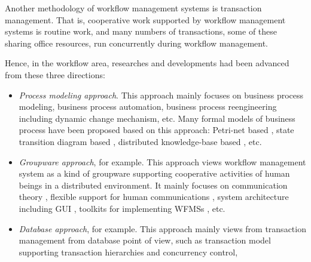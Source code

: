Another methodology of workflow management systems is transaction
management.  That is, cooperative work supported by workflow management
systems is routine work, and many numbers of transactions, some of these 
sharing office resources, run concurrently during workflow management.

Hence, in the workflow area, researches and developments had been
advanced from these three directions:
\begin{itemize}
 \item \begin{sloppypar}
	\emph{Process modeling approach}.  This approach mainly focuses on
       	business process modeling, business process automation, business
       	process reengineering including dynamic change mechanism, etc.
       	Many formal models of business process have been proposed based
       	on this approach: Petri-net based \cite{ishii:tripsj86,%
       	ishii:jip91, blumenthal:coocs95, ellis:coocs95}, state transition
       	diagram based \cite{humphrey:icse89, harel:ieeese90,%
       	sarin:cocs91, jarke:ijicis92, swenson:coocs93, isaka:tripsjgw96},
       	distributed knowledge-base based \cite{tueni:studiescscw91,%
       	jarke:ijicis92, plexousakis:coocs95, mahling:ieeeexpert95,
	robinson:nsf96}, etc.
       \end{sloppypar}
 \item \begin{sloppypar}
	\emph{Groupware approach}, \cite{shepherd:cscw90, kaplan:cocs91,%
       	medina-mora:cscw92, mahling:coocs93, tarumi:tipsj95} for example.
       	This approach views workflow management system as a kind of
       	groupware supporting cooperative activities of human beings in a
       	distributed environment.  It mainly focuses on communication
       	theory \cite{winograd:book86, mahling:coocs93}, flexible support
       	for human communications \cite{mazer:toois84, bogia:coocs93,%
       	blumenthal:coocs95, iiduka:tripsj96}, system architecture
       	including GUI \cite{kaplan:cocs91}, toolkits for implementing
	WFMSs \cite{forst:jdps95}, etc.
       \end{sloppypar}
 \item \emph{Database approach},  \cite{georgakopoulos:ijicis94,
       rusinkiewicz:adbis94, krishnakumar:jdps95, alonso:icde96} for
       example.  This approach mainly views from transaction management
       from database point of view, such as transaction model supporting 
       transaction hierarchies and concurrency control, 
\end{itemize}

